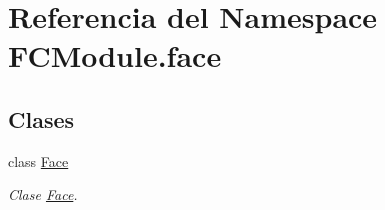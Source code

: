 \hypertarget{namespace_f_c_module_1_1face}{}\section{Referencia del Namespace F\+C\+Module.\+face}
\label{namespace_f_c_module_1_1face}
\subsection*{Clases}
\begin{DoxyCompactItemize}
\item 
class \mbox{\hyperlink{class_f_c_module_1_1face_1_1_face}{Face}}
\begin{DoxyCompactList}\small\item\em Clase \mbox{\hyperlink{class_f_c_module_1_1face_1_1_face}{Face}}. \end{DoxyCompactList}\end{DoxyCompactItemize}
